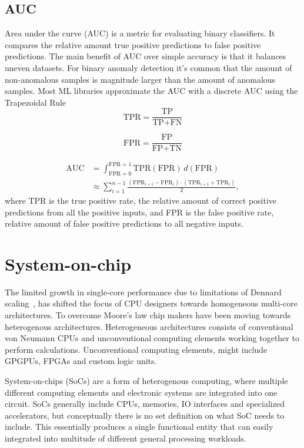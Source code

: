 \documentclass[12pt,a4paper,english
]{tunithesis}
\begin{document}
\subsection{AUC}
Area under the curve (AUC) is a metric for evaluating binary classifiers. It compares the relative amount true positive predictions to false positive predictions.
The main benefit of AUC over simple accuracy is that it balances uneven datasets. For binary anomaly detection it's common that the amount of non-anomalous samples is magnitude larger than the amount of anomalous samples.
Most ML libraries approximate the AUC with a discrete AUC using the Trapezoidal Rule~\cite{paszke_pytorch_2019}
\begin{equation}
\text{TPR} =  \frac{\text{TP}}{\text{TP} + \text{FN}}
\end{equation}

\begin{equation}
\text{FPR} = \frac{\text{FP}}{\text{FP} + \text{TN}}
\end{equation}

\begin{align}
  \text{AUC} & = \int_{\text{FPR}=0}^{\text{FPR}=1} \text{TPR}(\text{FPR}) \, d(\text{FPR}) \\
  & \approx \sum_{i=1}^{n-1} \frac{(\text{FPR}_{i+1} - \text{FPR}_i) \cdot (\text{TPR}_{i+1} + \text{TPR}_i)}{2},
\end{align}
where TPR is the true positive rate, the relative amount of correct positive predictions from all the positive inputs, and FPR is the false positive rate, relative amount of false positive predictions to all negative inputs.

\section{System-on-chip}
The limited growth in single-core performance due to limitations of Dennard scaling~\cite{esmaeilzadeh_dark_2011}, has shifted the focus of CPU designers towards homogeneous multi-core architectures.
To overcome Moore's law chip makers have been moving towards heterogenous architectures. Heterogeneous architectures consists of conventional von Neumann CPUs and unconventional computing elements working together to perform calculations. Unconventional computing elements, might include GPGPUs, FPGAs and custom logic units.~\cite{chung_single-chip_2010}

System-on-chips (SoCs) are a form of heterogenous computing, where multiple different computing elements and electronic systems are integrated into one circuit.
SoCs generally include CPUs, memories, IO interfaces and specialized accelerators, but conceptually there is no set definition on what SoC needs to include.
This essentially produces a single functional entity that can easily integrated into multitude of different general processing workloads.
\end{document}
